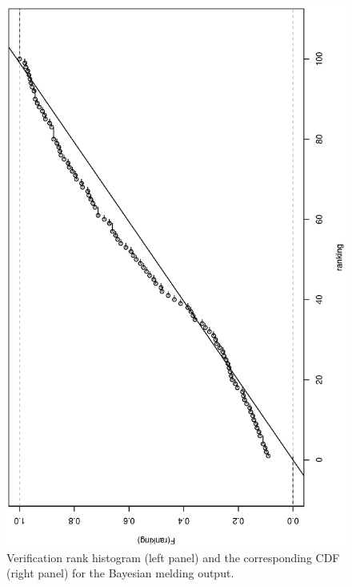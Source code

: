 \documentclass[11pt, fleqn]{article}
\begin{document}
\begin{figure}[t]
\begin{center}
\begin{minipage}{8cm}
\includegraphics[scale=0.3, angle=-90]{pic/bm_pit_cdf_present.ps}
\end{minipage}
\caption{\label{fig:bm-vrh}\small  Verification rank histogram (left panel) and
  the corresponding CDF (right panel) for the Bayesian melding output.}
\end{center}
\end{figure}
\end{document}
